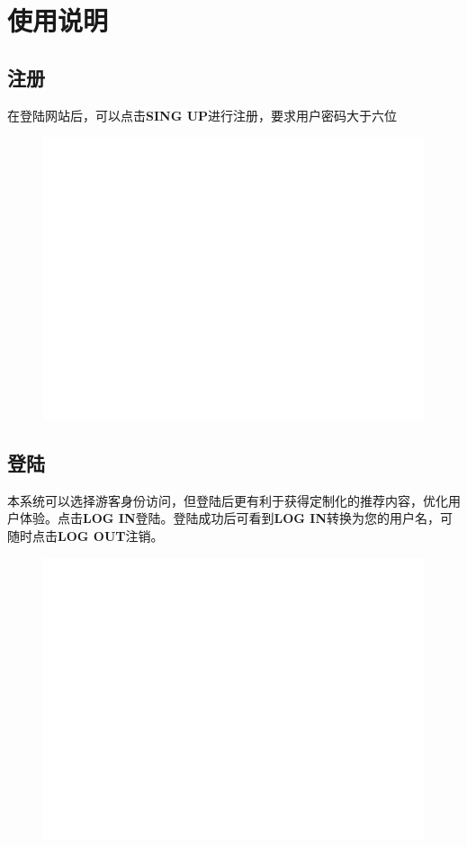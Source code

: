 \documentclass[UTF8]{ctexart}
\begin{document}
\newpage
\section{使用说明}
\subsection{注册}
在登陆网站后，可以点击{\bfseries SING UP}进行注册，要求用户密码大于六位
\begin{figure}[h]
    \centering
    \includegraphics[width=\textwidth]{manual_images//temp.png}
\end{figure}

\newpage
\subsection{登陆}
本系统可以选择游客身份访问，但登陆后更有利于获得定制化的推荐内容，优化用户体验。点击{\bfseries LOG IN}登陆。登陆成功后可看到{\bfseries LOG IN}转换为您的用户名，可随时点击{\bfseries LOG OUT}注销。
\begin{figure}[h]
    \centering
    \includegraphics[width=\textwidth]{manual_images//temp.png}
\end{figure}
\end{document}
